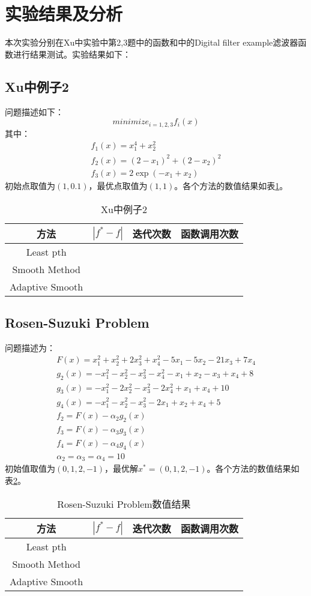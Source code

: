 \documentclass{ctexart}
\begin{document}
\section{实验结果及分析}
本次实验分别在Xu\cite{Xu2001}中实验中第2,3题中的函数和\cite{Charalambous1979}中的Digital filter example滤波器函数进行结果测试。实验结果如下：
\subsection{Xu\cite{Xu2001}中例子2}
问题描述如下：
\[minimize_{i=1,2,3}f_i(x)\]
其中：
\begin{align}
f_1(x) = x_1^4+x_2^2\\
f_2(x) = (2-x_1)^2 + (2-x_2)^2\\
f_3(x) = 2\exp(-x_1+x_2)
\end{align}
初始点取值为$(1,0.1)$，最优点取值为$(1,1)$。各个方法的数值结果如表\ref{tab:xu2}。
\begin{table}[htpb]
	\centering
	\caption{Xu中例子2}
	\label{tab:xu2}
	\begin{tabular}{c c c c}
	\hine
	方法 & $|f^*-f|$ & 迭代次数 & 函数调用次数 \\\hline
	Least pth & & & \\
	Smooth Method & & & \\
	Adaptive Smooth & & & \\
	\hline
	\end{tabular}
\end{table}
\subsection{Rosen-Suzuki Problem}
问题描述为：
\begin{align}
	F(x)=x_1^2+x_2^2+2x_3^2+x_4^2-5x_1-5x_2-21x_3+7x_4\\
	g_2(x)=-x_1^2-x_2^2-x_3^2-x_4^2-x_1+x_2-x_3+x_4+8\\
	g_3(x)=-x_1^2-2x_2^2-x_3^2-2x_4^2+x_1+x_4+10\\
	g_4(x)=-x_1^2-x_2^2-x_3^2-2x_1+x_2+x_4+5\\
	f_2=F(x)-\alpha_2g_2(x)\\
	f_3=F(x)-\alpha_3g_3(x)\\
	f_4=F(x)-\alpha_4g_4(x)\\
	\alpha_2=\alpha_3=\alpha_4=10
\end{align}
初始值取值为$(0,1,2,-1)$，最优解$x^*=(0,1,2,-1)$。各个方法的数值结果如表\ref{tab:rspro}。
\begin{table}[htpb]
	\centering
	\caption{Rosen-Suzuki Problem数值结果}
	\label{tab:rspro}
	\begin{tabular}{c c c c}
	\hine
	方法 & $|f^*-f|$ & 迭代次数 & 函数调用次数 \\\hline
	Least pth & & & \\
	Smooth Method & & & \\
	Adaptive Smooth & & & \\
	\hline
	\end{tabular}
\end{table}
\end{document}
